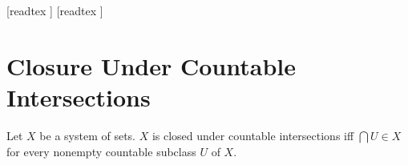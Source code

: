 \documentclass[10pt]{article}
\begin{document}
  \begin{imports}
    \begin{forthel}
      [readtex ]
      [readtex ]
    \end{forthel}
  \end{imports}


  \section*{Closure Under Countable Intersections}

  \begin{forthel}
    \begin{definition}[id=FOUNDATIONS_14_451771879129088,printid]
      Let $X$ be a system of sets.
      $X$ is closed under countable intersections iff $\bigcap U \in X$ for every nonempty countable subclass $U$ of $X$.
    \end{definition}
  \end{forthel}
\end{document}
